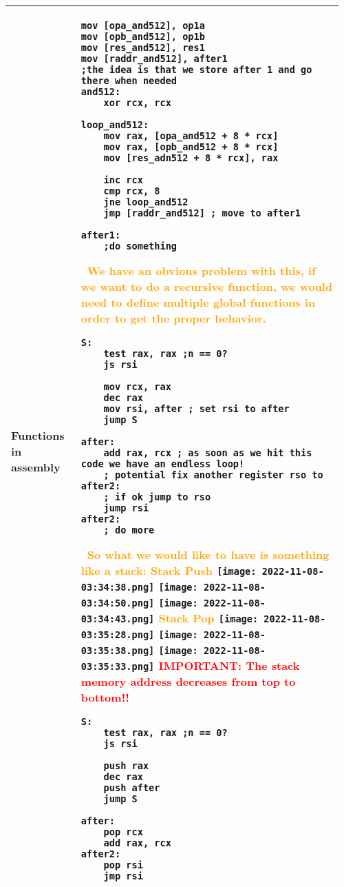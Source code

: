 \documentclass[main.tex,fontsize=8pt,paper=a4,paper=portrait,DIV=calc,]{scrartcl}
\begin{document}
\begin{table}[ht!]
\begin{tabular}{|m{0.2\linewidth}|m{0.755\linewidth}|}
\hline
Functions in assembly & 
\begin{lstlisting}
mov [opa_and512], op1a
mov [opb_and512], op1b
mov [res_and512], res1
mov [raddr_and512], after1
;the idea is that we store after 1 and go there when needed
and512:
    xor rcx, rcx

loop_and512:
    mov rax, [opa_and512 + 8 * rcx]
    mov rax, [opb_and512 + 8 * rcx]
    mov [res_adn512 + 8 * rcx], rax

    inc rcx
    cmp rcx, 8 
    jne loop_and512
    jmp [raddr_and512] ; move to after1

after1:
    ;do something
\end{lstlisting} 
\, \newline
\textcolor{orange}{We have an obvious problem with this, if we want to do a recursive function, we would need to define multiple global functions in order to get the proper behavior.}\newline
\begin{lstlisting}
S: 
    test rax, rax ;n == 0?
    js rsi

    mov rcx, rax
    dec rax
    mov rsi, after ; set rsi to after
    jump S 

after: 
    add rax, rcx ; as soon as we hit this code we have an endless loop!
    ; potential fix another register rso to after2:
    ; if ok jump to rso
    jump rsi
after2:
    ; do more
\end{lstlisting}
\, \newline
\textcolor{orange}{So what we would like to have is something like a stack:}\newline
\textcolor{orange}{Stack Push}\newline
\texttt{[image: 2022-11-08-03:34:38.png]}
\texttt{[image: 2022-11-08-03:34:50.png]}
\texttt{[image: 2022-11-08-03:34:43.png]}\newline
\textcolor{orange}{Stack Pop}\newline
\texttt{[image: 2022-11-08-03:35:28.png]}
\texttt{[image: 2022-11-08-03:35:38.png]}
\texttt{[image: 2022-11-08-03:35:33.png]}\newline
\textcolor{red}{IMPORTANT: The stack memory address decreases from top to bottom!!}\newline
\begin{lstlisting}
S: 
    test rax, rax ;n == 0?
    js rsi

    push rax
    dec rax
    push after
    jump S 

after: 
    pop rcx
    add rax, rcx
after2:
    pop rsi
    jmp rsi
\end{lstlisting}\\
\hline
\end{tabular}
\end{table}
\end{document}
